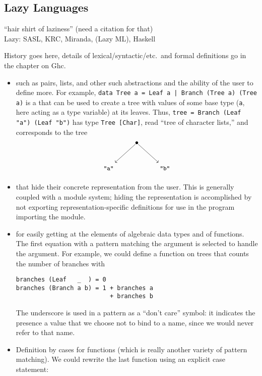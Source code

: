 \subsection{Lazy Languages}
``hair shirt of laziness'' (need a citation for that)\\
Lazy: SASL, KRC, Miranda, (Lazy ML), Haskell

History goes here, details of lexical/syntactic/etc.~and formal definitions go in the chapter on Ghc.

\begin{itemize}
\item {} such as pairs, lists, and other such abstractions and the ability of the user to define more. For example, \lstinline{data Tree a = Leaf a | Branch (Tree a) (Tree a)} is a  that can be used to create a tree with values of some base type (\lstinline{a}, here acting as a type variable) at its leaves. Thus, \lstinline{tree = Branch (Leaf "a") (Leaf "b")} has type \mbox{\lstinline{Tree [Char]}}, read ``tree of character lists,'' and corresponds to the tree
\[
\begin{xy}\SelectTips{eu}{10}
\xymatrix{%
&*{\bullet}\ar[dl] \ar[dr]\\
*++\txt{\code{"a"}}&&*++\txt{\code{"b"}}}
\end{xy}
\]
\item {} that hide their concrete representation from the user. This is generally coupled with a module system; hiding the representation is accomplished by not exporting representation-specific definitions for use in the program importing the module.
\item {} for easily getting at the elements of algebraic data types and  of functions. The first equation with a pattern matching the argument is selected to handle the argument. For example, we could define a function on trees that counts the number of branches with
\begin{lstlisting}
branches (Leaf   _  ) = 0
branches (Branch a b) = 1 + branches a
                          + branches b
\end{lstlisting}
The underscore is used in a pattern as a ``don't care'' symbol: it indicates the presence a value that we choose not to bind to a name, since we would never refer to that name.
\item Definition by cases for functions (which is really another variety of pattern matching). We could rewrite the last function using an explicit case statement:

\end{itemize}

